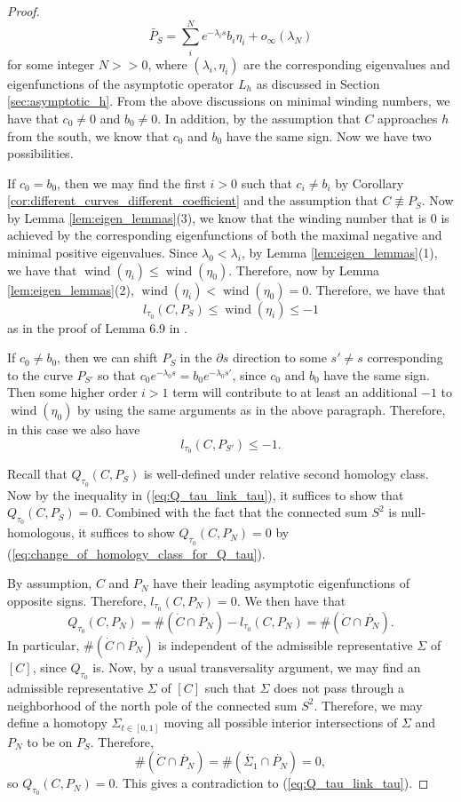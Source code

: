 \documentclass{article}
\numberwithin{equation}{section}
\theoremstyle{definition}
\newcommand{\wind}{\operatorname{wind}}
\begin{document}
\begin{proof}
\begin{equation}
    \widetilde{P_S} = \sum_i^N e^{-\lambda_i s} b_i \eta_i +o_\infty(\lambda_N)
\end{equation}
for some integer $N>>0$, where $(\lambda_i, \eta_i)$ are the corresponding eigenvalues and eigenfunctions of the asymptotic operator $L_h$ as discussed in Section \ref{sec:asymptotic_h}. From the above discussions on minimal winding numbers, we have that $c_0 \neq 0$ and $b_0 \neq 0$. In addition, by the assumption that $C$ approaches $h$ from the south, we know that $c_0$ and $b_0$ have the same sign. Now we have two possibilities. 


If $c_0 = b_0$, then we may find the first $i>0$ such that $c_i \neq b_i$ by Corollary \ref{cor:different_curves_different_coefficient} and the assumption that $C \not\equiv P_S$. Now by Lemma \ref{lem:eigen_lemmas}(3), we know that the winding number that is $0$ is achieved by the corresponding eigenfunctions of both the maximal negative and minimal positive eigenvalues. Since $\lambda_0<\lambda_i$, by Lemma \ref{lem:eigen_lemmas}(1), we have that $\wind(\eta_{i}) \leq \wind(\eta_{0})$. Therefore, now by Lemma \ref{lem:eigen_lemmas}(2), $\wind(\eta_{i}) < \wind(\eta_{0}) = 0$. Therefore, we have that $$l_{\tau_0}(C, P_S) \leq \wind(\eta_{i}) \leq -1$$ 
as in the proof of Lemma 6.9 in \cite{Hutchings_index_inequality}. 

If $c_0 \neq b_0$, then we can shift $P_S$ in the $\partial s$ direction to some $s'\neq s$ corresponding to the curve $P_{S'}$ so that $c_0 e^{-\lambda_0 s} = b_0 e^{-\lambda_0 s'}$, since $c_0$ and $b_0$ have the same sign. Then some higher order $i>1$ term will contribute to at least an additional $-1$ to $\wind(\eta_0)$ by using the same arguments as in the above paragraph. Therefore, in this case we also have 
$$l_{\tau_0}(C, P_{S'}) \leq -1.$$


Recall that $Q_{\tau_0}(C, P_S)$ is well-defined under relative second homology class. Now by the inequality in (\ref{eq:Q_tau_link_tau}), it suffices to show that $Q_{\tau_0}(C, P_S) =0$. Combined with the fact that the connected sum $S^2$ is null-homologous, it suffices to show $Q_{\tau_0}(C, P_N) = 0$ by (\ref{eq:change_of_homology_class_for_Q_tau}).


By assumption, $C$ and $P_N$ have their leading asymptotic eigenfunctions of opposite signs. Therefore, $l_{\tau_0}(C, P_N) = 0$. We then have that 
$$Q_{\tau_0}(C, P_N) = \#(\dot{C} \cap \dot{P_N}) - l_{\tau_0}(C, P_N)=  \#(\dot{C} \cap \dot{P_N}).$$ 
In particular, $\#(\dot{C} \cap \dot{P_N})$ is independent of the admissible representative $\Sigma$ of $[C]$, since $Q_{\tau_0}$ is. Now, by a usual transversality argument, we may find an admissible representative $\Sigma$ of $[C]$ such that $\Sigma$ does not pass through a neighborhood of the north pole of the connected sum $S^2$. Therefore, we may define a homotopy $\Sigma_{t\in [0,1]}$ moving all possible interior intersections of $\Sigma$ and $P_N$ to be on $P_S$. Therefore, 
$$\#(\dot{C} \cap \dot{P_N}) = \#(\dot{\Sigma_1} \cap \dot{P_N}) = 0,$$
so $Q_{\tau_0}(C, P_N) = 0$. This gives a contradiction to (\ref{eq:Q_tau_link_tau}).
\end{proof}
\end{document}
